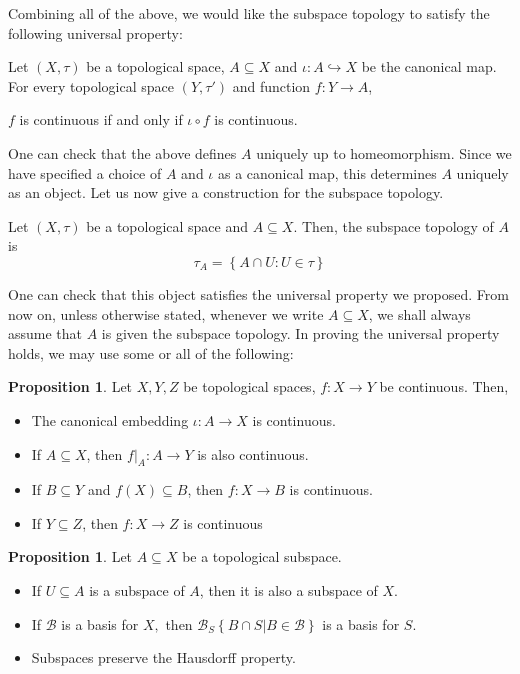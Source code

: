 \documentclass[12pt,reqno]{amsart}
\numberwithin{theorem}{section}
\theoremstyle{definition}
\theoremstyle{remark}
\numberwithin{equation}{section}
\newcommand{\set}[1]{\left \{ #1 \right \}}
\theoremstyle{definition}
\newtheorem{prop}[theorem]{Proposition}
\begin{document}
Combining all of the above, we would like the subspace topology to satisfy the following universal property:
\begin{proposition}
    Let $(X,\tau)$ be a topological space, $A\subseteq X$ and $\iota: A \hookrightarrow X$ be the canonical map. For every topological space $(Y,\tau')$ and function $f:Y\rightarrow A$, 
    \begin{center}
    \end{center}
    $f$ is continuous if and only if $\iota \circ f$ is continuous.
\end{proposition}
One can check that the above defines $A$ uniquely up to homeomorphism. Since we have specified a choice of $A$ and $\iota$ as a canonical map, this determines $A$ uniquely as an object. Let us now give a construction for the subspace topology.
\begin{definition}
    Let $(X,\tau)$ be a topological space and $A \subseteq X$. Then, the subspace topology of $A$ is
    $$\tau_A = \set{A \cap U : U \in \tau}$$
\end{definition}
One can check that this object satisfies the universal property we proposed. From now on, unless otherwise stated, whenever we write $A\subseteq X$, we shall always assume that $A$ is given the subspace topology. In proving the universal property holds, we may use some or all of the following:
\begin{prop}
Let $X,Y,Z$ be topological spaces, $f:X\rightarrow Y$ be continuous. Then,
    \begin{itemize}
        \item The canonical embedding $\iota:A\rightarrow X$ is continuous.
        \item If $A \subseteq X$, then $f|_A:A\rightarrow  Y$ is also continuous.
        \item If $B \subseteq Y$ and $f(X) \subseteq B$, then $f:X\rightarrow B$ is continuous.
        \item If $Y\subseteq Z$, then $f:X\rightarrow Z$ is continuous
    \end{itemize}
\end{prop}

\begin{prop}
    Let $A \subseteq X$ be a topological subspace. 
    \begin{itemize}
        \item If $U \subseteq A$ is a subspace of $A$, then it is also a subspace of $X$. 
        \item If $\mathcal{B}$ is a basis for $X,$ then $
        \mathcal{B}_S\set{B \cap S | B \in \mathcal{B}}$ is a basis for $S$.
        \item Subspaces preserve the Hausdorff property.
    \end{itemize}
\end{prop}
\end{document}
